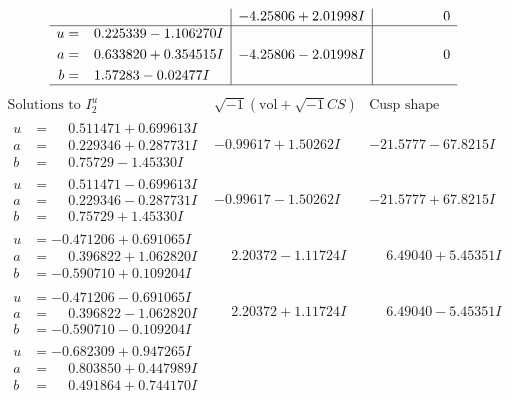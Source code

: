 \documentclass[1p]{elsarticle_modified}
\theoremstyle{definition}
\newcommand{\I}{\sqrt{-1}}
\begin{document}
$$\begin{array}{c|c|c}
 & -4.25806 + 2.01998 I & \phantom{-0.000000 } 0 \\ \hline\begin{aligned}
u &= \phantom{-}0.225339 - 1.106270 I \\
a &= \phantom{-}0.633820 + 0.354515 I \\
b &= \phantom{-}1.57283 - 0.02477 I\end{aligned}
 & -4.25806 - 2.01998 I & \phantom{-0.000000 } 0\\
 \hline 
 \end{array}$$\newpage$$\begin{array}{c|c|c}  
\text{Solutions to }I^u_{2}& \I (\text{vol} + \sqrt{-1}CS) & \text{Cusp shape}\\
 \hline 
\begin{aligned}
u &= \phantom{-}0.511471 + 0.699613 I \\
a &= \phantom{-}0.229346 + 0.287731 I \\
b &= \phantom{-}0.75729 - 1.45330 I\end{aligned}
 & -0.99617 + 1.50262 I & -21.5777 - 67.8215 I \\ \hline\begin{aligned}
u &= \phantom{-}0.511471 - 0.699613 I \\
a &= \phantom{-}0.229346 - 0.287731 I \\
b &= \phantom{-}0.75729 + 1.45330 I\end{aligned}
 & -0.99617 - 1.50262 I & -21.5777 + 67.8215 I \\ \hline\begin{aligned}
u &= -0.471206 + 0.691065 I \\
a &= \phantom{-}0.396822 + 1.062820 I \\
b &= -0.590710 + 0.109204 I\end{aligned}
 & \phantom{-}2.20372 - 1.11724 I & \phantom{-}6.49040 + 5.45351 I \\ \hline\begin{aligned}
u &= -0.471206 - 0.691065 I \\
a &= \phantom{-}0.396822 - 1.062820 I \\
b &= -0.590710 - 0.109204 I\end{aligned}
 & \phantom{-}2.20372 + 1.11724 I & \phantom{-}6.49040 - 5.45351 I \\ \hline\begin{aligned}
u &= -0.682309 + 0.947265 I \\
a &= \phantom{-}0.803850 + 0.447989 I \\
b &= \phantom{-}0.491864 + 0.744170 I\end{aligned}

\end{array}$$
\end{document}
